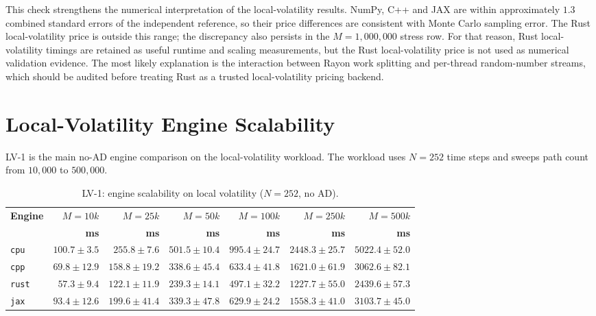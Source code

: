 

This check strengthens the numerical interpretation of the local-volatility
results. NumPy, C++ and JAX are within approximately \(1.3\) combined standard
errors of the independent reference, so their price differences are consistent
with Monte Carlo sampling error. The Rust local-volatility price is outside
this range; the discrepancy also persists in the \(M=1{,}000{,}000\) stress
row. For that reason, Rust local-volatility timings are retained as useful
runtime and scaling measurements, but the Rust local-volatility price is not
used as numerical validation evidence. The most likely explanation is the
interaction between Rayon work splitting and per-thread random-number streams,
which should be audited before treating Rust as a trusted local-volatility
pricing backend.

\section{Local-Volatility Engine Scalability}
\label{sec:results-lv1}

LV-1 is the main no-AD engine comparison on the local-volatility workload.
The workload uses \(N=252\) time steps and sweeps path count from
\(10{,}000\) to \(500{,}000\).

\begin{table}[htbp]
\centering
\small
\caption{LV-1: engine scalability on local volatility (\(N=252\), no AD).}
\label{tab:lv1-engine-scalability}
\begin{tabular}{lrrrrrr}
\toprule
\textbf{Engine}
& \textbf{\(M=10k\)}
& \textbf{\(M=25k\)}
& \textbf{\(M=50k\)}
& \textbf{\(M=100k\)}
& \textbf{\(M=250k\)}
& \textbf{\(M=500k\)} \\
& \textbf{ms} & \textbf{ms} & \textbf{ms} & \textbf{ms} & \textbf{ms} & \textbf{ms} \\
\midrule
\texttt{cpu}
& \(100.7\pm 3.5\)
& \(255.8\pm 7.6\)
& \(501.5\pm10.4\)
& \(995.4\pm24.7\)
& \(2448.3\pm25.7\)
& \(5022.4\pm52.0\) \\
\texttt{cpp}
& \(69.8\pm12.9\)
& \(158.8\pm19.2\)
& \(338.6\pm45.4\)
& \(633.4\pm41.8\)
& \(1621.0\pm61.9\)
& \(3062.6\pm82.1\) \\
\texttt{rust}
& \(57.3\pm 9.4\)
& \(122.1\pm11.9\)
& \(239.3\pm14.1\)
& \(497.1\pm32.2\)
& \(1227.7\pm55.0\)
& \(2439.6\pm57.3\) \\
\texttt{jax}
& \(93.4\pm12.6\)
& \(199.6\pm41.4\)
& \(339.3\pm47.8\)
& \(629.9\pm24.2\)
& \(1558.3\pm41.0\)
& \(3103.7\pm45.0\) \\
\bottomrule
\end{tabular}
\end{table}

